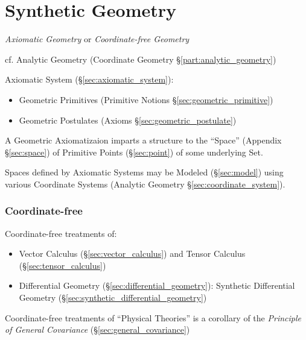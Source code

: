 \part{Synthetic Geometry}\label{part:synthetic_geometry}

\emph{Axiomatic Geometry} or \emph{Coordinate-free Geometry}

\fist cf. Analytic Geometry (Coordinate Geometry \S\ref{part:analytic_geometry})

Axiomatic System (\S\ref{sec:axiomatic_system}):
\begin{itemize}
  \item Geometric Primitives (Primitive Notions \S\ref{sec:geometric_primitive})
  \item Geometric Postulates (Axioms \S\ref{sec:geometric_postulate})
\end{itemize}
A Geometric Axiomatizaion imparts a structure to the ``Space'' (Appendix
\S\ref{sec:space}) of Primitive Points (\S\ref{sec:point}) of some underlying
Set.

\fist Spaces defined by Axiomatic Systems may be Modeled (\S\ref{sec:model})
using various Coordinate Systems (Analytic Geometry
\S\ref{sec:coordinate_system}).



\section{Coordinate-free}\label{sec:coordinate_free}

Coordinate-free treatments of:
\begin{itemize}
  \item Vector Calculus (\S\ref{sec:vector_calculus}) and Tensor Calculus
    (\S\ref{sec:tensor_calculus})
  \item Differential Geometry (\S\ref{sec:differential_geometry}):
    Synthetic Differential Geometry
      (\S\ref{sec:synthetic_differential_geometry})
\end{itemize}

Coordinate-free treatments of ``Physical Theories'' is a corollary of the
\emph{Principle of General Covariance} (\S\ref{sec:general_covariance})

